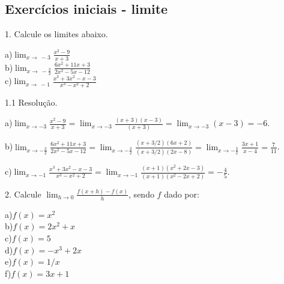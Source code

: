 \documentclass{article}
\begin{document}
{\begin{newpage}
\subsection{Exercícios iniciais - limite}
\begin{flushleft}
1. Calcule os limites abaixo.
\end{flushleft}
\begin{multicols}{3}
a)$\displaystyle{\lim_{x\to\ -3} \frac{x^2 - 9}{x+3}}$\\
b)$\displaystyle{\lim_{x\to\ -\frac{3}{2}} \frac{6x^2 + 11x + 3}{2x^2 - 5x - 12}}$\\
c)$\displaystyle{\lim_{x\to\ -1} \frac{x^3 + 3x^2 -x - 3}{x^3 - x^2 + 2}}$
\end{multicols}
\par
\begin{flushleft}
1.1 Resolução.
\end{flushleft}
\vspace{0.3cm}
\par
a)$\displaystyle{\lim_{x\to-3} \frac{x^2 - 9}{x+3} =
\lim_{x\to-3} \frac{(x+3)(x-3)}{(x+3)} =
\lim_{x\to-3} (x-3) = -6}$.
\vspace{0.3cm}
\par
b)$\displaystyle{\lim_{x\to -\frac{3}{2}} \frac{6x^2 + 11x + 3}{2x^2 - 5x - 12} = \lim_{x\to -\frac{3}{2}} \frac{(x+3/2)(6x+2)}{(x+3/2)(2x-8)} = \lim_{x\to -\frac{3}{2}} \frac{3x + 1}{x-4} = \frac{7}{11}}$.
\vspace{0.3cm}
\par
c)$\displaystyle{\lim_{x\to -1} \frac{x^3 + 3x^2 -x - 3}{x^3 - x^2 + 2} = \lim_{x\to -1} \frac{(x+1)(x^2 + 2x - 3)}{(x+1)(x^2 - 2x + 2)} = -\frac{4}{5}}$.
\vspace{0.3cm}
\begin{flushleft}
2. Calcule $\displaystyle{\lim_{h\to 0} \frac{f(x+h) - f(x)}{h}}$, sendo $f$ dado por:
\end{flushleft}
\par
\begin{multicols}{3}
\hspace{-15pt}a)$f(x)=x^2$\\
b)$f(x)=2x^2 + x$\\
c)$f(x)=5$\\
d)$f(x)=-x^3 + 2x$\\
e)$f(x)=1/x$\\
f)$f(x)=3x+1$
\end{multicols}
\vspace{0.3cm}
\begin{flushleft}

\end{flushleft}
\end{newpage}}
\end{document}
